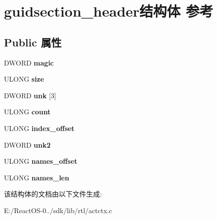 \hypertarget{structguidsection__header}{}\section{guidsection\+\_\+header结构体 参考}
\label{structguidsection__header}
\subsection*{Public 属性}
\begin{DoxyCompactItemize}
\item 
\mbox{\label{structguidsection__header_aacfce6285ec15bbc5a2e7a9873951c51}} 
D\+W\+O\+RD {\bfseries magic}
\item 
\mbox{\label{structguidsection__header_a4b854b771c701aa5946bfee87a80c900}} 
U\+L\+O\+NG {\bfseries size}
\item 
\mbox{\label{structguidsection__header_a0d323ec7ce881ce61b033c321213bc35}} 
D\+W\+O\+RD {\bfseries unk} \mbox{[}3\mbox{]}
\item 
\mbox{\label{structguidsection__header_abfc90016668c6f543708ba528005dba6}} 
U\+L\+O\+NG {\bfseries count}
\item 
\mbox{\label{structguidsection__header_a232f2d0dac76f9dbabd48e2d8d245a15}} 
U\+L\+O\+NG {\bfseries index\+\_\+offset}
\item 
\mbox{\label{structguidsection__header_afc0cd7a80d90fb0450a88c8f1303cd98}} 
D\+W\+O\+RD {\bfseries unk2}
\item 
\mbox{\label{structguidsection__header_afdf4a71a6964ed4caf111ba97a46e7c5}} 
U\+L\+O\+NG {\bfseries names\+\_\+offset}
\item 
\mbox{\label{structguidsection__header_a7d4463a905c5712dd7ef782e8de14ff7}} 
U\+L\+O\+NG {\bfseries names\+\_\+len}
\end{DoxyCompactItemize}


该结构体的文档由以下文件生成\+:\begin{DoxyCompactItemize}
\item 
E\+:/\+React\+O\+S-\/0../sdk/lib/rtl/actctx.\+c\end{DoxyCompactItemize}
